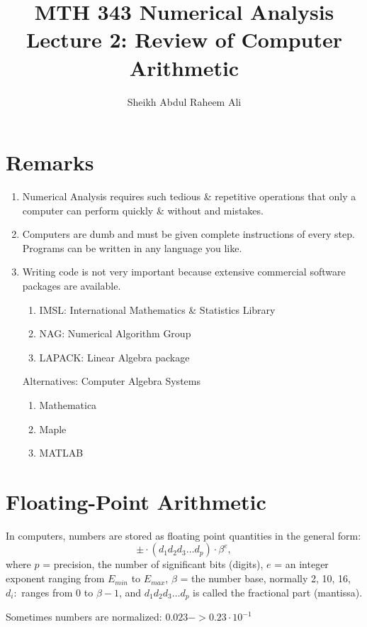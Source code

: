 \documentclass[]{article}
\title{MTH 343 Numerical Analysis Lecture 2: Review of Computer Arithmetic}
\author{Sheikh Abdul Raheem Ali}
\begin{document}
\maketitle

\section*{Remarks}

\begin{enumerate}
	\item Numerical Analysis requires such tedious \& repetitive operations that only a computer can perform quickly \& without and mistakes.
	\item Computers are dumb and must be given complete instructions of every step. Programs can be written in any language you like. 
	\item Writing code is not very important because extensive commercial software packages are available. 
		\begin{enumerate}
			\item IMSL: International Mathematics \& Statistics Library
			\item NAG: Numerical Algorithm Group
			\item LAPACK: Linear Algebra package
		\end{enumerate}	
		Alternatives: Computer Algebra Systems
		\begin{enumerate}
			\item Mathematica
			\item Maple
			\item MATLAB
		\end{enumerate}
	
\end{enumerate}

\section*{Floating-Point Arithmetic}

In computers, numbers are stored as floating point quantities in the general form: 
\[ \pm \cdot (d_1 d_2 d_3 \ldots d_p) \cdot \beta^e, \] where
$ p $ = precision, the number of significant bits (digits), $ e $ = an integer exponent ranging from $ E_{min} $ to $ E_{max} $, $ \beta $ = the number base, normally 2, 10, 16,
$ d_i: $ ranges from 0 to $ \beta - 1 $, and $ d_1 d_2 d_3 \ldots d_p $ is called the fractional part (mantissa). 



Sometimes numbers are normalized: $ 0.023 -> 0.23 \cdot 10^{-1} $
\end{document}
